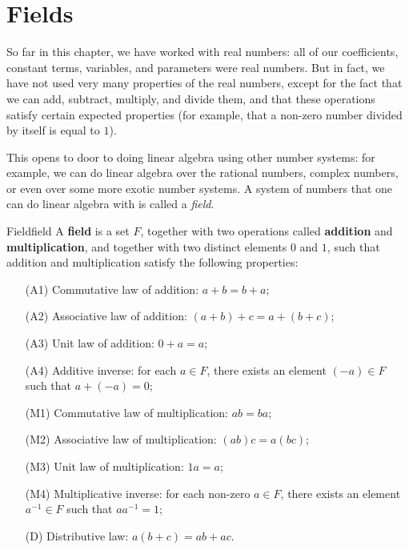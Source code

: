 \section{Fields}

So far in this chapter, we have worked with real numbers: all of our
coefficients, constant terms, variables, and parameters were real
numbers. But in fact, we have not used very many properties of the
real numbers, except for the fact that we can add, subtract, multiply,
and divide them, and that these operations satisfy certain expected
properties (for example, that a non-zero number divided by itself is
equal to $1$).

This opens to door to doing linear algebra using other number systems:
for example, we can do linear algebra over the rational numbers,
complex numbers, or even over some more exotic number systems. A
system of numbers that one can do linear algebra with is called a {\em
  field}.

\begin{definition}{Field}{field}
  A \textbf{field} is a set $F$, together with two
  operations called \textbf{addition} and
  \textbf{multiplication}, and together
  with two distinct elements $0$ and $1$, such that addition and
  multiplication satisfy the following properties:
  \begin{itemize}
  \item[(A1)] {Commutative law of addition:} $a+b=b+a$;
  \item[(A2)] {Associative law of addition:} $(a+b)+c = a+(b+c)$;
  \item[(A3)] {Unit law of addition:} $0+a = a$;
  \item[(A4)] {Additive inverse:} for each $a\in F$, there exists an element $(-a)\in F$ such that $a+(-a)=0$;
  \item[(M1)] {Commutative law of multiplication:} $ab=ba$;
  \item[(M2)] {Associative law of multiplication:} $(ab)c=a(bc)$;
  \item[(M3)] {Unit law of multiplication:} $1a=a$;
  \item[(M4)] {Multiplicative inverse:} for each non-zero $a\in F$, there exists an element $a^{-1}\in F$ such that $aa^{-1}=1$;
  \item[(D)] {Distributive law:} $a(b+c)=ab+ac$.
  \end{itemize}
\end{definition}

